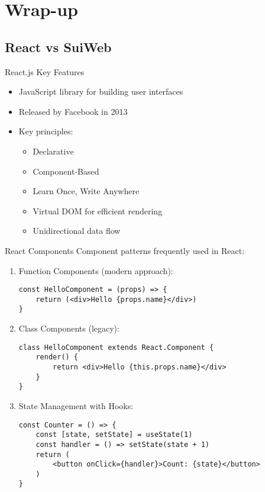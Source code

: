 \section{Wrap-up}

\subsection{React vs SuiWeb}
\begin{concept}{React.js Key Features}
    \begin{itemize}
        \item JavaScript library for building user interfaces
        \item Released by Facebook in 2013
        \item Key principles:
            \begin{itemize}
                \item Declarative
                \item Component-Based
                \item Learn Once, Write Anywhere
                \item Virtual DOM for efficient rendering
                \item Unidirectional data flow
            \end{itemize}
    \end{itemize}
\end{concept}

\begin{KR}{React Components}
Component patterns frequently used in React:
\begin{enumerate}
    \item Function Components (modern approach):
        \begin{verbatim}
const HelloComponent = (props) => {
    return (<div>Hello {props.name}</div>)
}
        \end{verbatim}
    \item Class Components (legacy):
        \begin{verbatim}
class HelloComponent extends React.Component {
    render() {
        return <div>Hello {this.props.name}</div>
    }
}
        \end{verbatim}
    \item State Management with Hooks:
        \begin{verbatim}
const Counter = () => {
    const [state, setState] = useState(1)
    const handler = () => setState(state + 1)
    return (
        <button onClick={handler}>Count: {state}</button>
    )
}
        \end{verbatim}
\end{enumerate}
\end{KR}

